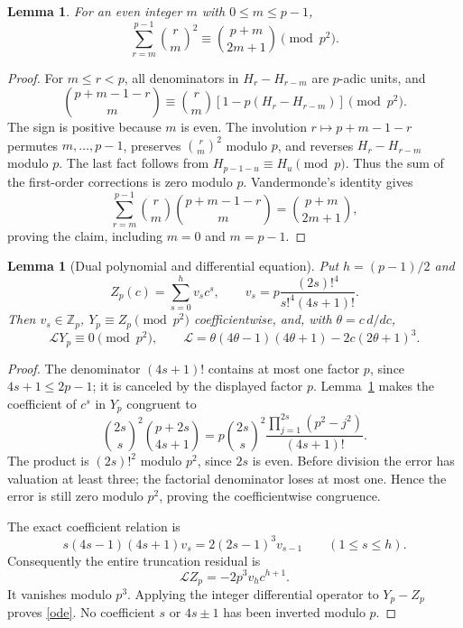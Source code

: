 \documentclass[11pt,a4paper]{article}
\newtheorem{lemma}[theorem]{Lemma}
\theoremstyle{remark}\newtheorem{remark}[theorem]{Remark}
\newcommand{\Z}{\mathbb Z}
\begin{document}
\begin{lemma}\label{vandermonde}
For an even integer \(m\) with \(0\le m\le p-1\),
\[
 \sum_{r=m}^{p-1}\binom rm^2
                \equiv\binom{p+m}{2m+1}\pmod {p^2}.
\]
\end{lemma}
\begin{proof}
For \(m\le r<p\), all denominators in \(H_r-H_{r-m}\) are \(p\)-adic
units, and
\[
 \binom{p+m-1-r}{m}\equiv
 \binom rm[1-p(H_r-H_{r-m})]\pmod {p^2}.
\]
The sign is positive because \(m\) is even.
The involution \(r\mapsto p+m-1-r\) permutes \(m,\ldots,p-1\),
preserves \(\binom rm^2\) modulo \(p\), and reverses
\(H_r-H_{r-m}\) modulo \(p\). The last fact follows from
\(H_{p-1-u}\equiv H_u\pmod p\). Thus the sum of the first-order
corrections is zero modulo \(p\).
Vandermonde's identity gives
\[
 \sum_{r=m}^{p-1}\binom rm\binom{p+m-1-r}{m}
                  =\binom{p+m}{2m+1},
\]
proving the claim, including \(m=0\) and \(m=p-1\).
\end{proof}

\begin{lemma}[Dual polynomial and differential equation]\label{dual}
Put \(h=(p-1)/2\) and
\[
 Z_p(c)=\sum_{s=0}^{h}v_s c^s,\qquad
 v_s=p\frac{(2s)!^4}{s!^4(4s+1)!}.
\]
Then \(v_s\in\Z_p\), \(Y_p\equiv Z_p\pmod {p^2}\) coefficientwise,
and, with \(\theta=c\,d/dc\),
\begin{equation}\label{ode}
 \mathcal L Y_p\equiv0\pmod {p^2},\qquad
 \mathcal L=\theta(4\theta-1)(4\theta+1)-2c(2\theta+1)^3 .
\end{equation}
\end{lemma}
\begin{proof}
The denominator \((4s+1)!\) contains at most one factor \(p\),
since \(4s+1\le2p-1\); it is canceled by the displayed factor \(p\).
Lemma~\ref{vandermonde} makes the coefficient of \(c^s\) in \(Y_p\)
congruent to
\[
 \binom{2s}s^2\binom{p+2s}{4s+1}
 =
 p\binom{2s}s^2
       \frac{\prod_{j=1}^{2s}(p^2-j^2)}{(4s+1)!}.
\]
The product is \((2s)!^2\) modulo \(p^2\), since \(2s\) is even.
Before division the error has valuation at least three; the factorial
denominator loses at most one. Hence the error is still zero modulo
\(p^2\), proving the coefficientwise congruence.

The exact coefficient relation is
\[
 s(4s-1)(4s+1)v_s=2(2s-1)^3v_{s-1}\qquad(1\le s\le h).
\]
Consequently the entire truncation residual is
\[
             \mathcal L Z_p=-2p^3v_h c^{h+1}.
\]
It vanishes modulo \(p^3\). Applying the integer differential operator
to \(Y_p-Z_p\) proves \eqref{ode}. No coefficient \(s\) or \(4s\pm1\)
has been inverted modulo \(p\).
\end{proof}
\end{document}
